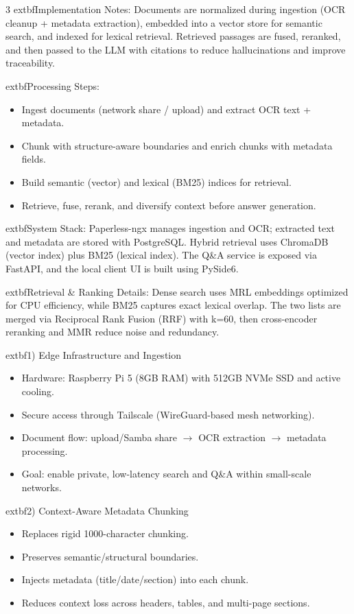 \documentclass[10pt,a4paper]{article}
\begin{document}
\begin{multicols}{3}
	extbf{Implementation Notes:} Documents are normalized during ingestion (OCR cleanup + metadata extraction), embedded into a vector store for semantic search, and indexed for lexical retrieval. Retrieved passages are fused, reranked, and then passed to the LLM with citations to reduce hallucinations and improve traceability.

	extbf{Processing Steps:}
\begin{itemize}
    \item Ingest documents (network share / upload) and extract OCR text + metadata.
    \item Chunk with structure-aware boundaries and enrich chunks with metadata fields.
    \item Build semantic (vector) and lexical (BM25) indices for retrieval.
    \item Retrieve, fuse, rerank, and diversify context before answer generation.
\end{itemize}

	extbf{System Stack:} Paperless-ngx manages ingestion and OCR; extracted text and metadata are stored with PostgreSQL. Hybrid retrieval uses ChromaDB (vector index) plus BM25 (lexical index). The Q\&A service is exposed via FastAPI, and the local client UI is built using PySide6.

	extbf{Retrieval \& Ranking Details:} Dense search uses MRL embeddings optimized for CPU efficiency, while BM25 captures exact lexical overlap. The two lists are merged via Reciprocal Rank Fusion (RRF) with \mbox{k=60}, then cross-encoder reranking and MMR reduce noise and redundancy.

	extbf{1) Edge Infrastructure and Ingestion}
\begin{itemize}
    \item Hardware: Raspberry Pi 5 (8GB RAM) with 512GB NVMe SSD and active cooling.
    \item Secure access through Tailscale (WireGuard-based mesh networking).
    \item Document flow: upload/Samba share $\rightarrow$ OCR extraction $\rightarrow$ metadata processing.
    \item Goal: enable private, low-latency search and Q\&A within small-scale networks.
\end{itemize}

	extbf{2) Context-Aware Metadata Chunking}
\begin{itemize}
    \item Replaces rigid 1000-character chunking.
    \item Preserves semantic/structural boundaries.
    \item Injects metadata (title/date/section) into each chunk.
    \item Reduces context loss across headers, tables, and multi-page sections.
\end{itemize}


\end{multicols}
\end{document}
